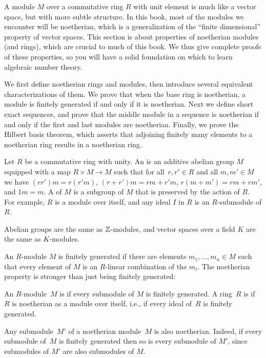 A module $M$ over a commutative ring $R$ with unit element is much
like a vector space, but with more subtle structure.  In this book,
most of the modules we encounter will be noetherian, which is a
generalization of the ``finite dimensional'' property of vector
spaces.  This section is about properties of noetherian modules (and
rings), which are crucial to much of this book.  We thus
give complete proofs of these properties, so you will have a solid
foundation on which to learn algebraic number theory.

We first define noetherian rings and modules, then introduce several
equivalent characterizations of them.  We prove that when the
base ring is noetherian, a module is finitely generated if and only if
it is noetherian.  Next we define short exact sequences, and prove
that the middle module in a sequence is noetherian if and only if the
first and last modules are noetherian.  Finally, we prove the Hilbert
basis theorem, which asserts that adjoining finitely many elements
to a noetherian ring results in a noetherian ring. 

Let $R$ be a commutative ring with unity.
An  is an additive abelian
group $M$ equipped with a map $R\times M \to M$ such that for all~$r,
r'\in R$ and all $m, m'\in M$ we have $(r r')m = r(r' m )$, $(r + r')m
= rm + r' m$, $r(m+m') = rm + rm'$, and $1m=m$.  A  of $M$
is a subgroup of $M$ that is preserved by the action of $R$.
For example, $R$ is a module over itself, and 
any ideal $I$ in $R$ is an $R$-submodule of $R$.

\begin{example}
Abelian groups are the same as $\mathbb{Z}$-modules, and vector spaces
over a field $K$ are the same as $K$-modules.
\end{example}

An $R$-module $M$ is finitely generated if there are elements $m_1, \ldots, m_n\in M$
such that every element of $M$ is an $R$-linear combination of the $m_i$.  The noetherian
property is stronger than just being finitely generated:

\begin{definition}[Noetherian] An $R$-module~$M$ is  if every
submodule of $M$ is finitely generated.  A ring~$R$ is
 if~$R$ is noetherian as a module over itself, i.e.,
if every ideal of~$R$ is finitely generated.
\end{definition}

Any submodule~$M'$ of a noetherian module~$M$ is also noetherian.
Indeed, if every submodule of~$M$ is finitely generated then so is
every submodule of $M'$, since submodules of $M'$ are also submodules
of $M$.

